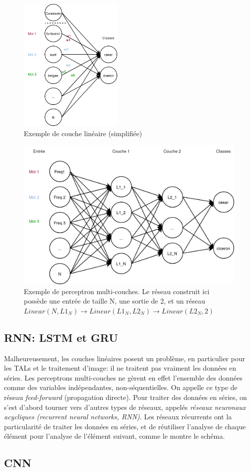 \begin{figure}
    \centering
    \includegraphics[width=5cm]{results/deep-learning/explanations/SimpleLinear.png}
    \caption{Exemple de couche linéaire (simplifiée)}
    \label{deep-learning:simple-linear}
\end{figure}
\begin{figure}
    \centering
    \includegraphics[width=\linewidth]{results/deep-learning/explanations/MLP.png}
    \caption{Exemple de perceptron multi-couches. Le réseau construit ici possède une entrée de taille N, une sortie de 2, et un réseau $Linear(N, L1_N) \rightarrow Linear(L1_N, L2_N) \rightarrow Linear(L2_N, 2)$}
    \label{deep-learning:mlp}
\end{figure}

\subsection{RNN: LSTM et GRU}

Malheureusement, les couches linéaires posent un problème, en particulier pour les TALs et le traitement d'image: il ne traitent pas vraiment les données en séries. Les perceptrons multi-couches ne gèrent en effet l'ensemble des données comme des variables indépendantes, non-séquentielles. On appelle ce type de réseau \textit{feed-forward} (propagation directe). Pour traiter des données en séries, on s'est d'abord tourner vers d'autres types de réseaux, appelés \textit{réseaux neuronaux acycliques (recurrent neural networks, RNN)}. Les réseaux récurrents ont la particularité de traiter les données en séries, et de réutiliser l'analyse de chaque élément pour l'analyse de l'élément suivant, comme le montre le schéma.

\subsection{CNN}